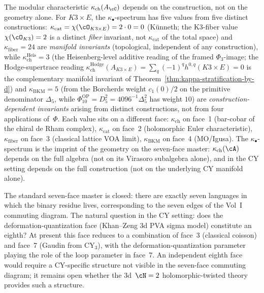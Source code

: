 \begin{remark}
\label{rem:kappa-face-by-face}
The modular characteristic $\kappa_{\mathrm{ch}}(A_\cC)$ depends on the construction,
not on the geometry alone. For $K3 \times E$, the $\kappa_\bullet$-spectrum
has five values from five distinct constructions:
$\kappa_{\mathrm{cat}} = \chi(\cO_{K3 \times E}) = 2 \cdot 0 = 0$ (K\"unneth;
the K3-fiber value $\chi(\cO_{K3}) = 2$ is a distinct \emph{fiber} invariant,
not $\kappa_{\mathrm{cat}}$ of the total space) and $\kappa_{\mathrm{fiber}} = 24$ are
\emph{manifold invariants} (topological, independent of any construction),
while $\kappa_{\mathrm{ch}}^{\mathrm{Heis}} = 3$ (the Heisenberg-level
additive reading of the framed $\Phi_3$-image; the Hodge-supertrace reading
$\kappa_{\mathrm{ch}}^{\mathrm{Hodge}}(A_{K3 \times E}) = \sum_q (-1)^q h^{0,q}(K3 \times
E) = 0$ is the complementary manifold invariant of
Theorem~\ref{thm:kappa-stratification-by-d}) and $\kappa_{\mathrm{BKM}}
= 5$ (from the Borcherds weight $c_1(0)/2$ on the primitive denominator
$\Delta_5$, while
$\Phi_{10}^{\mathrm{OP}}=D_5^2=4096^{-1}\Delta_5^2$ has weight $10$) are
\emph{construction-dependent invariants} arising from distinct
constructions, not from four applications of~$\Phi$. Each value sits on
a different face: $\kappa_{\mathrm{ch}}$ on face~1 (bar-cobar of the
chiral de Rham complex), $\kappa_{\mathrm{cat}}$ on face~2 (holomorphic
Euler characteristic), $\kappa_{\mathrm{fiber}}$ on face~3 (classical
lattice VOA limit), $\kappa_{\mathrm{BKM}}$ on face~4 (MO/Igusa). The
$\kappa_\bullet$-spectrum is the imprint of the geometry on the
seven-face master: $\kappa_{\mathrm{ch}}(\cA)$ depends on the full
algebra (not on its Virasoro subalgebra alone), and in the CY setting
depends on the full construction (not on the underlying CY manifold
alone).
\end{remark}

\begin{remark}
\label{rem:outlook-eighth-face}
The standard seven-face master is closed: there are exactly seven
languages in which the binary residue lives, corresponding to the seven
edges of the Vol~I commuting diagram. The natural question in the CY setting: does the
deformation-quantization face (Khan--Zeng 3d PVA sigma model)
constitute an eighth? At present this face reduces to a
combination of face~3 (classical coisson) and face~7 (Gaudin from
CY$_3$), with the deformation-quantization parameter playing the role of
the loop parameter in face~7. An independent eighth face would require
a CY-specific structure not visible in the seven-face commuting diagram;
it remains open whether the
$3$d~$\cN = 2$ holomorphic-twisted theory provides such a structure.
\end{remark}


